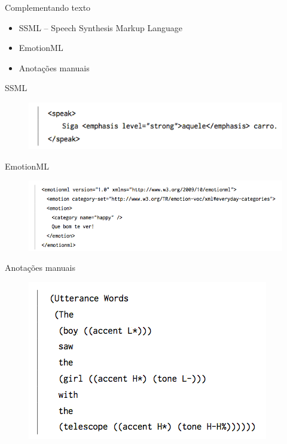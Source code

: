 \documentclass{beamer}
\begin{document}
\begin{frame}{Complementando texto}
  \begin{itemize}
  \item SSML -- Speech Synthesis Markup Language
  \item EmotionML
  \item Anotações manuais
  \end{itemize}
\end{frame}

\begin{frame}{SSML}
    \begin{figure}
      \includegraphics[scale=0.60]{ssml.png}
    \end{figure}
\end{frame}

\begin{frame}{EmotionML}
    \begin{figure}
      \includegraphics[scale=0.40]{emotionml.png}
    \end{figure}
\end{frame}

\begin{frame}{Anotações manuais}
    \begin{figure}
      \includegraphics[scale=0.60]{manual.png}
    \end{figure}
\end{frame}
\end{document}

